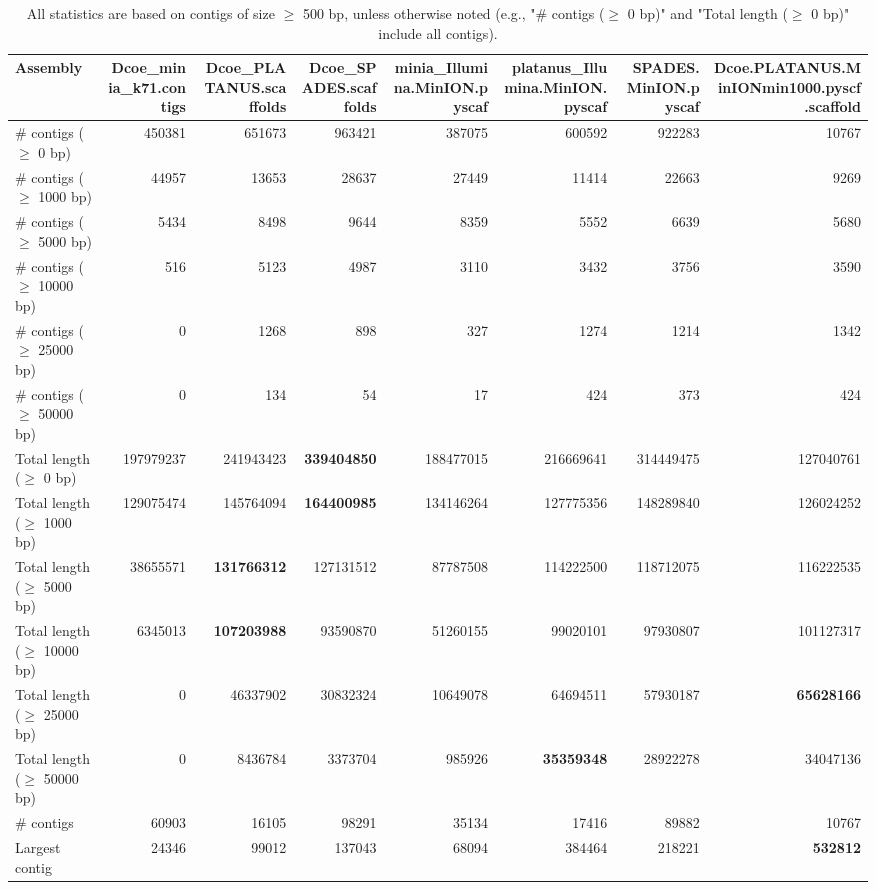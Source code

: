 \documentclass[12pt,a4paper]{article}
\begin{document}
\begin{table}[ht]
\begin{center}
\caption{All statistics are based on contigs of size $\geq$ 500 bp, unless otherwise noted (e.g., "\# contigs ($\geq$ 0 bp)" and "Total length ($\geq$ 0 bp)" include all contigs).}
\begin{tabular}{|l*{7}{|r}|}
\hline
Assembly & Dcoe\_minia\_k71.contigs & Dcoe\_PLATANUS.scaffolds & Dcoe\_SPADES.scaffolds & minia\_Illumina.MinION.pyscaf & platanus\_Illumina.MinION.pyscaf & SPADES.MinION.pyscaf & Dcoe.PLATANUS.MinIONmin1000.pyscf.scaffold \\ \hline
\# contigs ($\geq$ 0 bp) & 450381 & 651673 & 963421 & 387075 & 600592 & 922283 & 10767 \\ \hline
\# contigs ($\geq$ 1000 bp) & 44957 & 13653 & 28637 & 27449 & 11414 & 22663 & 9269 \\ \hline
\# contigs ($\geq$ 5000 bp) & 5434 & 8498 & 9644 & 8359 & 5552 & 6639 & 5680 \\ \hline
\# contigs ($\geq$ 10000 bp) & 516 & 5123 & 4987 & 3110 & 3432 & 3756 & 3590 \\ \hline
\# contigs ($\geq$ 25000 bp) & 0 & 1268 & 898 & 327 & 1274 & 1214 & 1342 \\ \hline
\# contigs ($\geq$ 50000 bp) & 0 & 134 & 54 & 17 & 424 & 373 & 424 \\ \hline
Total length ($\geq$ 0 bp) & 197979237 & 241943423 & {\bf 339404850} & 188477015 & 216669641 & 314449475 & 127040761 \\ \hline
Total length ($\geq$ 1000 bp) & 129075474 & 145764094 & {\bf 164400985} & 134146264 & 127775356 & 148289840 & 126024252 \\ \hline
Total length ($\geq$ 5000 bp) & 38655571 & {\bf 131766312} & 127131512 & 87787508 & 114222500 & 118712075 & 116222535 \\ \hline
Total length ($\geq$ 10000 bp) & 6345013 & {\bf 107203988} & 93590870 & 51260155 & 99020101 & 97930807 & 101127317 \\ \hline
Total length ($\geq$ 25000 bp) & 0 & 46337902 & 30832324 & 10649078 & 64694511 & 57930187 & {\bf 65628166} \\ \hline
Total length ($\geq$ 50000 bp) & 0 & 8436784 & 3373704 & 985926 & {\bf 35359348} & 28922278 & 34047136 \\ \hline
\# contigs & 60903 & 16105 & 98291 & 35134 & 17416 & 89882 & 10767 \\ \hline
Largest contig & 24346 & 99012 & 137043 & 68094 & 384464 & 218221 & {\bf 532812} \\ \hline

\end{tabular}
\end{center}
\end{table}
\end{document}
